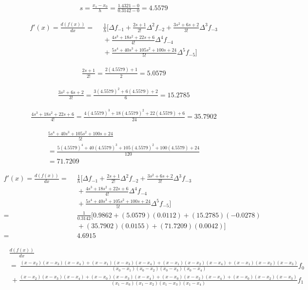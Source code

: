 \begin{align*}
    s = \frac{x_s - x_0}{h} = \frac{1.4321 - 0}{ 0.3142 - 0} = 4.5579
\end{align*}

\begin{align*}
    f'(x) = \frac{d(f(x))}{dx} =~&~  \frac{1}{h} \Bigg[ \Delta f_{-1} + \frac{2s + 1}{2!} \Delta^2 f_{-2} + \frac{3s^2 + 6s + 2}{3!} \Delta^3 f_{-3} \\
        &~+ \frac{4s^3 + 18s^2 + 22s + 6}{4!} \Delta^4 f_{-4} \\
        &~+ \frac{5s^4 + 40s^3 + 105s^2 + 100s + 24}{5!} \Delta^5 f_{-5}
        \Bigg]
\end{align*}

\begin{align*}
    \frac{2s + 1}{2!} = \frac{2(4.5579) + 1}{2} = 5.0579
\end{align*}

\begin{align*}
    \frac{3s^2 + 6s + 2}{3!} = \frac{3(4.5579)^2 + 6(4.5579) + 2}{6} = 15.2785
\end{align*}

\begin{align*}
    \frac{4s^3 + 18s^2 + 22s + 6}{4!} = \frac{4(4.5579)^3 + 18(4.5579)^2 + 22(4.5579) + 6}{24} = 35.7902
\end{align*}

\begin{multline*}
    \frac{5s^4 + 40s^3 + 105s^2 + 100s + 24}{5!} \\
    = \frac{5(4.5579)^4 + 40(4.5579)^3 + 105(4.5579)^2 + 100(4.5579) + 24}{120} \\
    = 71.7209
\end{multline*}

\begin{align*}
    f'(x) = \frac{d(f(x))}{dx} =~&~  \frac{1}{h} \Bigg[ \Delta f_{-1} + \frac{2s + 1}{2!} \Delta^2 f_{-2} + \frac{3s^2 + 6s + 2}{3!} \Delta^3 f_{-3} \\
        &~+ \frac{4s^3 + 18s^2 + 22s + 6}{4!} \Delta^4 f_{-4} \\
        &~+ \frac{5s^4 + 40s^3 + 105s^2 + 100s + 24}{5!} \Delta^5 f_{-5}
        \Bigg] \\
        =~&~  \frac{1}{0.3142} \Bigg[ 0.9862 + (5.0579) (0.0112) + (15.2785) (-0.0278) \\
        &~+ (35.7902) (0.0155) + (71.7209) (0.0042)
        \Bigg] \\
        =~&~ 4.6915
\end{align*}

\begin{align*}
&\frac{d(f(x))}{dx} \\
&=~ \frac{(x-x_2)(x-x_3)(x-x_4) + (x-x_1)(x-x_3)(x-x_4) + (x-x_1)(x-x_2)(x-x_4) + (x-x_1)(x-x_2)(x-x_3)}{(x_0-x_1)(x_0-x_2)(x_0-x_3)(x_0-x_4)}f_0 \\
&~+ \frac{(x-x_2)(x-x_3)(x-x_4) + (x-x_0)(x-x_3)(x-x_4) + (x-x_0)(x-x_2)(x-x_4) + (x-x_0)(x-x_2)(x-x_3)}{(x_1-x_0)(x_1-x_2)(x_1-x_3)(x_1-x_4)}f_1
\end{align*}